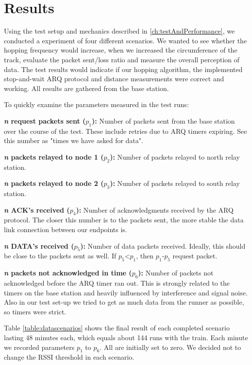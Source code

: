\chapter{Results}\label{ch:results}

Using the test setup and mechanics described in \ref{ch:testAndPerformance}, we conducted a experiment of four different scenarios. We wanted to see whether the hopping frequency would increase, when we increased the circumference of the track, evaluate the packet sent/loss ratio and measure the overall perception of data. The test results would indicate if our hopping algorithm, the implemented stop-and-wait ARQ protocol and distance measurements were correct and working. All results are gathered from the base station.

\noindent To quickly examine the parameters measured in the test runs:

\noindent \textbf{\textit{n} request packets sent ($p_1$):} Number of packets sent from the base station over the course of the test. These include retries due to ARQ timers expiring. See this number as "times we have asked for data".

\noindent \textbf{\textit{n} packets relayed to node 1 ($p_2$):} Number of packets relayed to north relay station.

\noindent \textbf{\textit{n} packets relayed to node 2 ($p_3$):} Number of packets relayed to south relay station.

\noindent \textbf{\textit{n} ACK's received ($p_4$):} Number of acknowledgments received by the ARQ protocol. The closer this number is to the packets sent, the more stable the data link connection between our endpoints is.

\noindent \textbf{\textit{n} DATA's received ($p_5$):} Number of data packets received. Ideally, this should be close to the packets sent as well. If $p_5$<$p_1$, then $p_1$-$p_5$ request packet.

\noindent \textbf{\textit{n} packets not acknowledged in time ($p_6$):} Number of packets not acknowledged before the ARQ timer ran out. This is strongly related to the timers on the base station and heavily influenced by interference and signal noise. Also in our test set-up we tried to get as much data from the runner as possible, so timers were strict.

\noindent Table \ref{table:datascenarios} shows the final result of each completed scenario lasting 48 minutes each, which equals about 144 runs with the train. Each minute we recorded parameters $p_1$ to $p_6$. All are initially set to zero. We decided not to change the RSSI threshold in each scenario.

